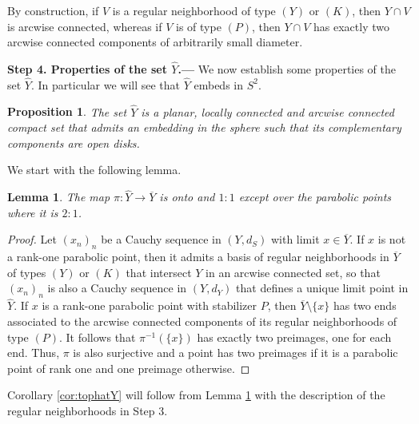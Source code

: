 \documentclass[11pt]{article}
\newtheorem{lemma}[theorem]{Lemma}
\newtheorem{proposition}[theorem]{Proposition}
\theoremstyle{definition}
\renewcommand\hat{\widehat}
\begin{document}
By construction, if $V$ is a regular neighborhood of type $(Y)$ or $(K)$, then $Y\cap V$ is arcwise connected, whereas if $V$ is of type $(P)$, then $Y\cap V$  has exactly two arcwise
connected components of arbitrarily small diameter.

\medskip

{\noindent\bf Step 4. Properties of the set $\hat{Y}$.---} 
We now establish some properties of the set $\hat{Y}$. In particular we will see that $\hat{Y}$ embeds in $S^2$.

\begin{proposition}\label{prop:tophatY} The set $\widehat{Y}$ is a planar, locally connected and arcwise connected compact
set that admits an embedding in the sphere such that its complementary components are open disks.
\end{proposition}

We start with the following lemma.

\begin{lemma}\label{lma:pifibers} The map $\pi:\widehat{Y} \to \overline{Y}$ is onto and $1:1$ except over the parabolic points where it is $2:1$.
\end{lemma}

\begin{proof}
Let $(x_n)_n$ be a Cauchy sequence in $(Y,d_S)$ with limit $x\in\overline{Y}$. If $x$ is not a rank-one parabolic point, then it admits a basis of regular neighborhoods in $\overline{Y}$
of types $(Y)$ or $(K)$ that intersect $Y$ in an arcwise connected set, so that $(x_n)_n$ is also a Cauchy sequence in $(Y,d_Y)$  that defines a unique 
limit point in $\widehat{Y}$.
If $x$ is a rank-one parabolic point with stabilizer $P$, then $\overline{Y}\setminus\{x\}$ 
has two ends associated to the arcwise connected components of its regular neighborhoods of type $(P)$.
It follows that $\pi^{-1}(\{x\})$ has exactly two preimages,  one for each end. Thus, $\pi$ is also surjective and a point has two preimages if it is a parabolic point of rank one and one preimage otherwise. 
\end{proof}

Corollary \ref{cor:tophatY} will follow  from Lemma \ref{lma:pifibers} with the description of the regular neighborhoods in Step 3. 
\end{document}
